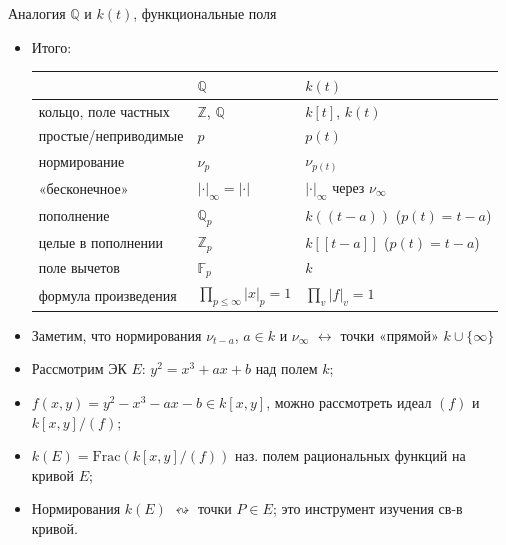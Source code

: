 \documentclass[serif, aspectratio=169]{beamer}
\begin{document}
\begin{frame}{Аналогия $\mathbb{Q}$ и $k(t)$, функциональные поля}
    \begin{itemize}
        \item Итого:
        \vspace{-3ex}
        \begin{center}
            \footnotesize
            \begin{tabular}{lll}
                \toprule
                & $\mathbb{Q}$ & $k(t)$ \\
                \midrule
                кольцо, поле частных & $\mathbb{Z}$, $\mathbb{Q}$ & $k[t]$, $k(t)$ \\
                простые/неприводимые & $p$ & $p(t)$ \\
                нормирование & $\nu_p$ & $\nu_{p(t)}$ \\
                «бесконечное» & $|\cdot|_\infty=|\cdot|$ & $|\cdot|_\infty$ через $\nu_\infty$ \\
                пополнение & $\mathbb{Q}_p$ & $k((t-a))$ ($p(t)=t-a$) \\
                целые в пополнении & $\mathbb{Z}_p$ & $k[[t-a]]$ ($p(t)=t-a$) \\
                поле вычетов & $\mathbb{F}_p$ & $k$ \\
                формула произведения & $\prod_{p\leqslant\infty}|x|_p=1$ & $\prod_v|f|_v=1$ \\
                \bottomrule
            \end{tabular}
        \end{center}
        \item Заметим, что нормирования $\nu_{t-a}$, $a\in k$ и $\nu_\infty$ $\leftrightarrow$ точки «прямой» $k\cup\{\infty\}$
        \item Рассмотрим ЭК $E$: $y^2=x^3+ax+b$ над полем $k$; 
        \item $f(x,y)=y^2-x^3-ax-b\in k[x,y]$, можно рассмотреть идеал $(f)$ и $k[x,y]/(f)$;
        \item $k(E)=\mathrm{Frac}(k[x,y]/(f))$ наз. полем рациональных функций на кривой $E$;
        \item Нормирования $k(E)$ $\leftrightsquigarrow$ точки $P\in E$; это инструмент изучения св-в 
        кривой.
    \end{itemize}

    \note{
        \begin{itemize}
            \item ---
        \end{itemize}
    }
\end{frame}
\end{document}
